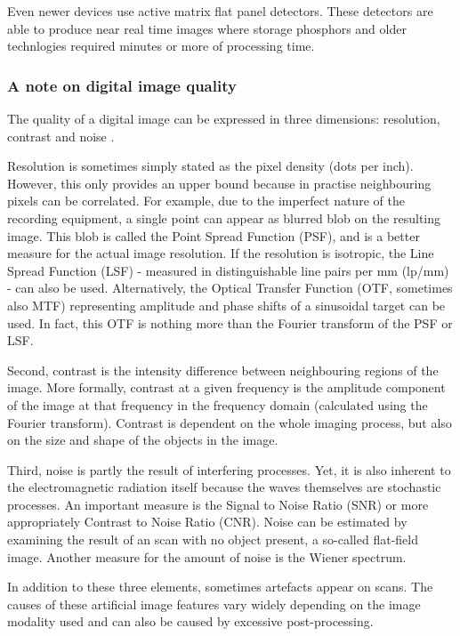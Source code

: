 Even newer devices use active matrix flat panel detectors. These detectors are
able to produce near real time images where storage phosphors and older
technlogies required minutes or more of processing time. %

\subsubsection{A note on digital image quality}
The quality of a digital image can be expressed in three dimensions: resolution,
contrast and noise \cite{suetens}.

Resolution is sometimes simply stated as the pixel density (dots per inch).
However, this only provides an upper bound because in practise neighbouring
pixels can be correlated. For example, due to the imperfect nature of the
recording equipment, a single point can appear as blurred blob on the resulting
image. This blob is called the Point Spread Function (PSF), and is a better
measure for the actual image resolution. If the resolution is isotropic, the
Line Spread Function (LSF) - measured in distinguishable line pairs per mm
(lp/mm) - can also be used. Alternatively, the Optical Transfer Function (OTF,
sometimes also MTF) representing amplitude and phase shifts of a sinusoidal
target can be used. In fact, this OTF is nothing more than the Fourier transform
of the PSF or LSF.

Second, contrast is the intensity difference between neighbouring regions of the
image. More formally, contrast at a given frequency is the amplitude component
of the image at that frequency in the frequency domain (calculated using the
Fourier transform). Contrast is dependent on the whole imaging process, but also
on the size and shape of the objects in the image.

Third, noise is partly the result of interfering processes. Yet, it is also
inherent to the electromagnetic radiation itself because the waves themselves
are stochastic processes. An important measure is the Signal to Noise Ratio
(SNR) or more appropriately Contrast to Noise Ratio (CNR). Noise can be
estimated by examining the result of an scan with no object present, a so-called
flat-field image. Another measure for the amount of noise is the Wiener
spectrum.

In addition to these three elements, sometimes artefacts appear on scans. The
causes of these artificial image features vary widely depending on the image
modality used and can also be caused by excessive post-processing.

